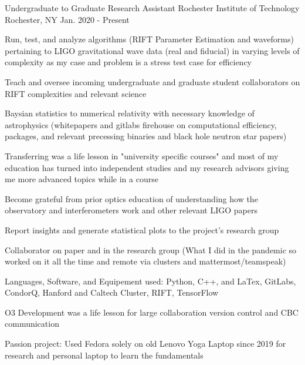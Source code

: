\begin{cventries}

    \cventry
    {Undergraduate to Graduate Research Assistant}
    {Rochester Institute of Technology}
    {Rochester, NY}
    {Jan. 2020 - Present}
    {
      \begin{cvitems}
        \item {Run, test, and analyze algorithms (RIFT Parameter Estimation and waveforms) pertaining to LIGO gravitational wave data (real and fiducial) in varying levels of complexity as my case and problem is a stress test case for efficiency}
        \item{Teach and oversee incoming undergraduate and graduate student collaborators on RIFT complexities and relevant science}
        \item{Baysian statistics to numerical relativity with necessary knowledge of astrophysics (whitepapers and gitlabs firehouse on computational efficiency, packages, and relevant precessing binaries and black hole neutron star papers)}
        \item{Transferring was a life lesson in "university specific courses" and most of my education has turned into independent studies and my research advisors giving me more advanced topics while in a course}
        \item{Become grateful from prior optics education of understanding how the observatory and interferometers work and other relevant LIGO papers}
        \item {Report insights and generate statistical plots to the project's research group}
        \item {Collaborator on paper and in the research group (What I did in the pandemic so worked on it all the time and remote via clusters and mattermost/teamspeak)}
        \item {Languages, Software, and Equipement used: Python, C++, and LaTex, GitLabs, CondorQ, Hanford and Caltech Cluster, RIFT, TensorFlow}
        \item{O3 Development was a life lesson for large collaboration version control and CBC communication}
        \item{Passion project: Used Fedora solely on old Lenovo Yoga Laptop since 2019 for research and personal laptop to learn the fundamentals}

\end{cvitems}}
\end{cventries}
